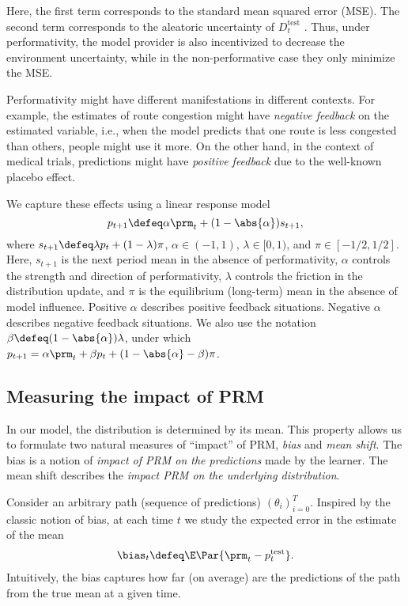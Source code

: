 Here, the first term corresponds to the standard mean squared error (MSE).
The second term corresponds to the aleatoric uncertainty of $D^\text{test}_t$
\citep[note that such decompositions are valid for a big class of
distributions,][]{g22e}. Thus, under performativity, the model provider is also incentivized to decrease the environment uncertainty, while in the
non-performative case they only minimize the MSE.

 Performativity might have different manifestations in different contexts. For example,
the estimates of route congestion might have \emph{negative feedback} on the
estimated variable, i.e., when the model predicts that one route is less
congested than others, people might use it more. On the
other hand, in the context of medical trials, predictions might have
\emph{positive feedback} due to the well-known placebo effect.

We capture these effects using a linear response model
\begin{equation}
\label{eqn:linear_response}
    p_{t+1} \defeq \alpha \prm_t + (1 - \abs{\alpha}) s_{t+1},
\end{equation}
where $s_{t+1} \defeq \lambda p_t + (1 - \lambda) \pi$, $\alpha \in (-1, 1)$,
$\lambda \in [0, 1)$, and $\pi \in [-1/2, 1/2]$. Here, $s_{t+1}$ is the next
period mean in the absence of performativity, $\alpha$ controls the strength
and direction of performativity, $\lambda$ controls the friction in the
distribution update, and $\pi$ is the equilibrium (long-term) mean in the
absence of model influence. Positive $\alpha$ describes positive feedback
situations. Negative $\alpha$ describes negative feedback situations. We also
use the notation $\beta \defeq (1 - \abs{\alpha}) \lambda$, under which $p_{t+1} = \alpha \prm_t + \beta p_t + (1 - \abs{\alpha} - \beta) \pi$.

\subsection{Measuring the impact of PRM}
\label{subsec:measures_of_impact}

In our model, the distribution is determined by its mean. This property allows
us to formulate two natural measures of ``impact'' of PRM, \textit{bias} and
\textit{mean shift}. The bias is a notion of \textit{impact of PRM on the predictions} made by the learner. The mean shift describes the
\textit{impact PRM on the underlying distribution}.

 Consider an arbitrary path (sequence of predictions) $(\theta_i)_{i=0}^T$. Inspired by the classic notion of bias, at each time $t$ we study the expected error in the
estimate of the mean
\begin{align}
\label{eqn:bias}
    \bias_t \defeq \E\Par{\prm_t - p^\text{test}_t}.
\end{align}
Intuitively, the bias captures how far (on average) are the predictions of the path from the true mean at a given time.

